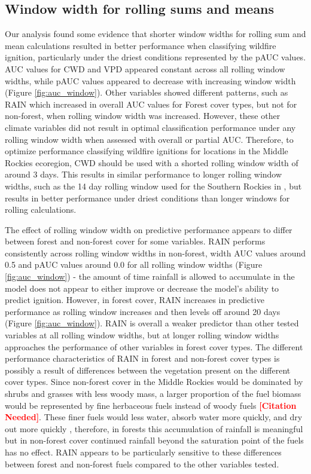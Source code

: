 \documentclass[11pt]{article}
\newcommand{\citethis}{\textbf{\textcolor{red}{[Citation Needed]}}}
\begin{document}
\subsection{Window width for rolling sums and means}

Our analysis found some evidence that shorter window widths for rolling sum and mean calculations resulted in better performance when classifying wildfire ignition, particularly under the driest conditions represented by the pAUC values. AUC values for CWD and VPD appeared constant across all rolling window widths, while pAUC values appeared to decrease with increasing window width (Figure \ref{fig:auc_window}). Other variables showed different patterns, such as RAIN which increased in overall AUC values for Forest cover types, but not for non-forest, when rolling window width was increased. However, these other climate variables did not result in optimal classification performance under any rolling window width when assessed with overall or partial AUC.  Therefore, to optimize performance classifying wildfire ignitions for locations in the Middle Rockies ecoregion, CWD should be used with a shorted rolling window width of around 3 days.  This results in similar performance to longer rolling window widths, such as the 14 day rolling window used for the Southern Rockies in  \citet{thomaWaterBalanceIndicator2020}, but results in better performance under driest conditions than longer windows for rolling calculations.

The effect of rolling window width on predictive performance appears to differ between forest and non-forest cover for some variables.  RAIN performs consistently across rolling window widths in non-forest, width AUC values around 0.5 and pAUC values around 0.0 for all rolling window widths (Figure \ref{fig:auc_window}) - the amount of time rainfall is allowed to accumulate in the model does not appear to either improve or decrease the model's ability to predict ignition. However, in forest cover, RAIN increases in predictive performance as rolling window increases and then levels off around 20 days (Figure \ref{fig:auc_window}). RAIN is overall a weaker predictor than other tested variables at all rolling window widths, but at longer rolling window widths approaches the performance of other variables in forest cover types. The different performance characteristics of RAIN in forest and non-forest cover types is possibly a result of differences between the vegetation present on the different cover types.  Since non-forest cover in the Middle Rockies would be dominated by shrubs and grasses with less woody mass, a larger proportion of the fuel biomass would be represented by fine herbaceous fuels instead of woody fuels \citethis. These finer fuels would less water, absorb water more quickly, and dry out more quickly \citep{vineyReviewFineFuel1991}, therefore, in forests this accumulation of rainfall is meaningful but in non-forest cover continued rainfall beyond the saturation point of the fuels has no effect.  RAIN appears to be particularly sensitive to these differences between forest and non-forest fuels compared to the other variables tested.
\end{document}

